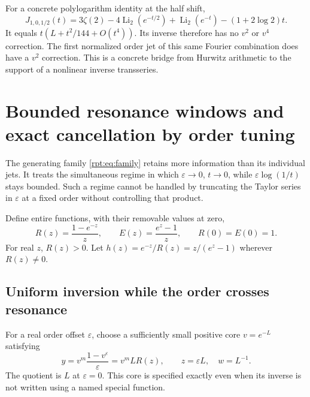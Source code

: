 \documentclass[11pt,a4paper]{article}
\numberwithin{equation}{section}
\theoremstyle{definition}\newtheorem{definition}[theorem]{Definition}
\theoremstyle{remark}\newtheorem{remark}[theorem]{Remark}
\newcommand{\Li}{\operatorname{Li}}
\newcommand{\eps}{\varepsilon}
\begin{document}
For a concrete polylogarithm identity at the half shift,
\begin{equation}
J_{1,0,1/2}(t)
=3\zeta(2)-4\Li_2(e^{-t/2})+\Li_2(e^{-t})
-(1+2\log2)t.
\label{rpt:eq:halfexample}
\end{equation}
It equals $t(L+t^2/144+O(t^4))$. Its inverse therefore has no $v^2$ or $v^4$ correction. The first normalized order jet of this same Fourier combination does have a $v^2$ correction. This is a concrete bridge from Hurwitz arithmetic to the support of a nonlinear inverse transseries.

\section{Bounded resonance windows and exact cancellation by order tuning}
\label{rpt:sec:window}

The generating family \eqref{rpt:eq:family} retains more information than its individual jets. It treats the simultaneous regime in which $\eps\to0$, $t\to0$, while $\eps\log(1/t)$ stays bounded. Such a regime cannot be handled by truncating the Taylor series in $\eps$ at a fixed order without controlling that product.

Define entire functions, with their removable values at zero,
\begin{equation}
R(z)=\frac{1-e^{-z}}{z},\qquad E(z)=\frac{e^z-1}{z},
\qquad R(0)=E(0)=1.
\label{rpt:eq:RE}
\end{equation}
For real $z$, $R(z)>0$. Let $h(z)=e^{-z}/R(z)=z/(e^z-1)$ wherever $R(z)\ne0$.

\subsection{Uniform inversion while the order crosses resonance}

For a real order offset $\eps$, choose a sufficiently small positive core $v=e^{-L}$ satisfying
\begin{equation}
y=v^m\frac{1-v^\eps}{\eps}=v^m L R(z),
\qquad z=\eps L,\quad w=L^{-1}.
\label{rpt:eq:deformedcore}
\end{equation}
The quotient is $L$ at $\eps=0$. This core is specified exactly even when its inverse is not written using a named special function.
\end{document}
